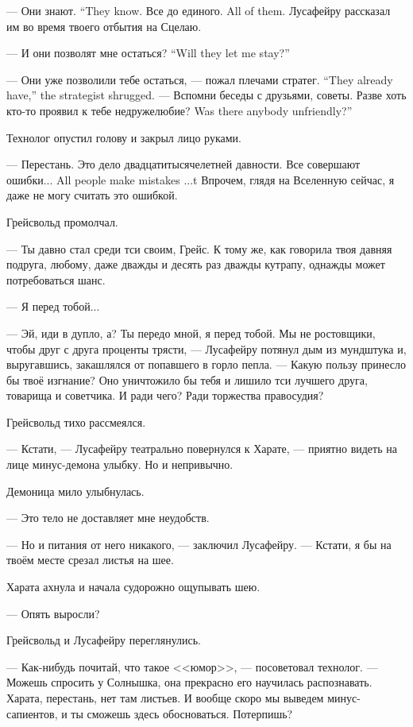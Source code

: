 {--- Они знают.}
{``They know.}
{Все до единого.}
{All of them.}
Лусафейру рассказал им во время твоего отбытия на Сцелаю.

{--- И они позволят мне остаться?}
{``Will they let me stay?''}

{--- Они уже позволили тебе остаться, --- пожал плечами стратег.}
{``They already have,'' the strategist shrugged.}
--- Вспомни беседы с друзьями, советы.
{Разве хоть кто-то проявил к тебе недружелюбие?}
{Was there anybody unfriendly?''}

Технолог опустил голову и закрыл лицо руками.

--- Перестань.
Это дело двадцатитысячелетней давности.
{Все совершают ошибки...}
{All people make mistakes ...t}
Впрочем, глядя на Вселенную сейчас, я даже не могу считать это ошибкой.

Грейсвольд промолчал.

--- Ты давно стал среди тси своим, Грейс.
К тому же, как говорила твоя давняя подруга, любому, даже дважды и десять раз дважды кутрапу, однажды может потребоваться шанс.

--- Я перед тобой...

--- Эй, иди в дупло, а?
Ты передо мной, я перед тобой.
Мы не ростовщики, чтобы друг с друга проценты трясти, --- Лусафейру потянул дым из мундштука и, выругавшись, закашлялся от попавшего в горло пепла.
--- Какую пользу принесло бы твоё изгнание?
Оно уничтожило бы тебя и лишило тси лучшего друга, товарища и советчика.
И ради чего?
Ради торжества правосудия?

Грейсвольд тихо рассмеялся.

--- Кстати, --- Лусафейру театрально повернулся к Харате, --- приятно видеть на лице минус-демона улыбку.
Но и непривычно.

Демоница мило улыбнулась.

--- Это тело не доставляет мне неудобств.

--- Но и питания от него никакого, --- заключил Лусафейру.
--- Кстати, я бы на твоём месте срезал листья на шее.

Харата ахнула и начала судорожно ощупывать шею.

--- Опять выросли?

Грейсвольд и Лусафейру переглянулись.

--- Как-нибудь почитай, что такое <<юмор>>, --- посоветовал технолог.
--- Можешь спросить у Солнышка, она прекрасно его научилась распознавать.
Харата, перестань, нет там листьев.
И вообще скоро мы выведем минус-сапиентов, и ты сможешь здесь обосноваться.
Потерпишь?

